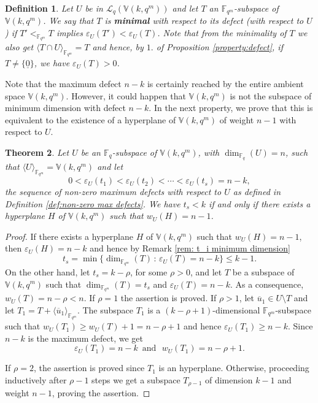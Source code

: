 \documentclass[11pt]{amsart}
\newtheorem{theorem}{Theorem}[section]
\newtheorem{definition}[theorem]{Definition}
\newcommand{\fqm}{\mathbb{F}_{q^m}}
\newcommand{\fq}{{\mathbb F}_{q}}
\newcommand{\la}{\langle}
\newcommand{\ra}{\rangle}
\begin{document}
\begin{definition}
 Let $U$ be in $\mathcal{L}_q(\mathbb{V}(k,q^m))$ and let $T$ an $\fqm$-subspace of $\mathbb{V}(k,q^m)$. We say that  $T$  is \textbf{minimal} with respect to its defect (with respect to $U$) if $T' <_{\fqm} T$ implies  $\varepsilon_{U}(T')< \varepsilon_{U}(T)$. Note that from the minimality of $T$ we also get $\la T\cap U\ra_{\fqm}=T$ and hence, by $1.$ of Proposition \ref{property:defect}, if $T\neq \{\underline 0\}$,  we have  $\varepsilon_U(T)>0$.
\end{definition}


Note that the maximum defect $n-k$ is certainly reached by the entire ambient space $\mathbb{V}(k,q^m)$. However, it could happen that $\mathbb{V}(k,q^m)$ is not the subspace of minimum dimension with defect $n-k$. 
In the next property, we prove that this is equivalent to the existence of a hyperplane of $\mathbb{V}(k,q^m)$ of weight $n-1$ with respect to $U$.


\begin{theorem} \label{thm:non degenerate property}
Let $U$ be an $\fq$-subspace of $\mathbb{V}(k,q^m)$,  with $\dim_{\fq} (U)=n$, such that $\langle U\rangle_{\fqm}=\mathbb{V}(k,q^m)$ and let 
\begin{equation} 
   0<  \varepsilon_U(t_1) < \varepsilon_U(t_2)< \cdots < \varepsilon_U(t_s)=n-k,
\end{equation}
the sequence of non-zero maximum defects with respect to $U$ as defined in Definition \ref{def:non-zero max defects}.
We have $t_s<k$ if and only if there exists a hyperplane $H$ of $\mathbb{V}(k,q^m)$ such that $w_U(H)=n-1$. 
\end{theorem}
\begin{proof}
If there exists a hyperplane $H$ of $\mathbb{V}(k,q^m)$ such that $w_U(H)=n-1$, then $\varepsilon_U(H)=n-k$ and hence by Remark \ref{rem: t_i minimum dimension}
\[t_s=\min\{\dim_{\fqm} (T) \,:\, \varepsilon_U(T)=n-k\}\leq k-1.\]
On the other hand, let $t_s=k-\rho$, for some $\rho >0$, and let $T$ be a subspace of $\mathbb{V}(k,q^m)$ such that $\dim_{\fqm} (T)=t_s$ and $\varepsilon_U(T)=n-k$. As a consequence, $w_U(T)=n-\rho <n$. If $\rho=1$ the assertion is proved.  If $\rho >1$, let $\overline{u}_1 \in U \setminus T$ and let  $T_1=T+\langle \overline{u}_1 \rangle_{\fqm}$. The subspace $T_1$ is a $(k-\rho+1)$-dimensional $\fqm$-subspace such that $w_U(T_1)\geq w_U(T)+1=n-\rho+1$ and hence $\varepsilon_U(T_1)\geq n-k$. Since $n-k$ is the maximum defect, 
we get 
\[\varepsilon_U(T_1)= n-k \,\,\, \mbox{and} \,\,\,\, w_U(T_1)= n-\rho+1.\]

If $\rho =2$, the assertion is proved since $T_1$ is an hyperplane.  Otherwise, proceeding inductively after $\rho-1$ steps we get a subspace $T_{\rho-1}$ of dimension $k-1$ and weight $n-1$, proving the assertion.
\end{proof}
\end{document}

